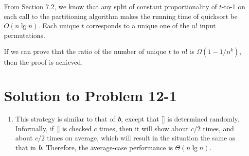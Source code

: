 \documentclass[a4paper, fleqn]{article}
\begin{document}
From Section 7.2, we know that any split of constant proportionality
of $t$-to-1 on each call to the partitioning algorithm makes the
running time of quicksort be $O(n \lg n)$. Each unique $t$ corresponds
to a unique one of the $n!$ input permutations.

If we can prove that the ratio of the number of unique $t$ to $n!$ is
$\Omega(1-1/n^k)$, then the proof is achieved.




\section*{Solution to Problem 12-1}
\begin{enumerate}
\renewcommand{\labelenumi}{\itshape \bfseries \alph{enumi}.}

\item  %
This strategy is similar to that of \textit{\textbf{b}}, except that
[] is determined randomly. Informally, if []
is checked $c$ times, then it will show  about $c/2$
times, and  about $c/2$ times on average, which will
result in the situation the same as that in
\textit{\textbf{b}}. Therefore, the average-case performance is
$\Theta(n \lg n)$.
\end{enumerate}
\end{document}
